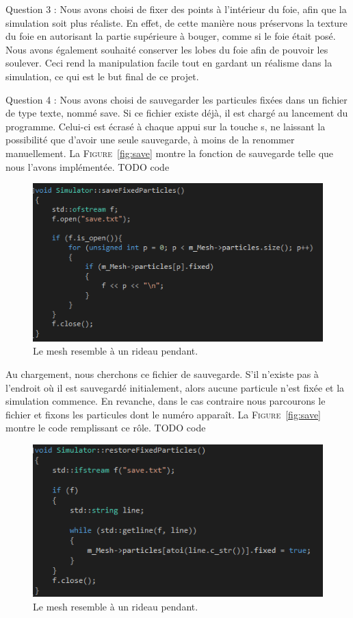 \documentclass[a4paper,12pt]{article}
\begin{document}
Question 3 : Nous avons choisi de fixer des points à l'intérieur du foie, afin que la simulation soit plus réaliste. En effet, de cette manière nous préservons la \og{}texture\fg{} du foie en autorisant la partie supérieure à bouger, comme si le foie était posé. Nous avons également souhaité conserver les lobes du foie afin de pouvoir les soulever. Ceci rend la manipulation facile tout en gardant un réalisme dans la simulation, ce qui est le but final de ce projet.

Question 4 : Nous avons choisi de sauvegarder les particules fixées dans un fichier de type texte, nommé \og{}save\fg{}. Si ce fichier existe déjà, il est chargé au lancement du programme. Celui-ci est écrasé à chaque appui sur la touche \og{}s\fg{}, ne laissant la possibilité que d'avoir une seule sauvegarde, à moins de la renommer manuellement. La \textsc{Figure}~\ref{fig:save} montre la fonction de sauvegarde telle que nous l'avons implémentée. 
TODO code
\begin{figure}
  \centering
  \includegraphics{images/save.png}
  \caption{Le mesh resemble à un rideau pendant.}
  \label{fig:pointFixe}
\end{figure}

Au chargement, nous cherchons ce fichier de sauvegarde. S'il n'existe pas à l'endroit où il est sauvegardé initialement, alors aucune particule n'est fixée et la simulation commence. En revanche, dans le cas contraire nous parcourons le fichier et fixons les particules dont le numéro apparaît. La \textsc{Figure}~\ref{fig:save} montre le code remplissant ce rôle.
TODO code
\begin{figure}
  \centering
  \includegraphics{images/restore.png}
  \caption{Le mesh resemble à un rideau pendant.}
  \label{fig:}
\end{figure}
\end{document}
